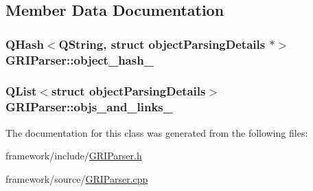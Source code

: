 \subsection{\-Member \-Data \-Documentation}
\hypertarget{classGRIParser_ab99d6201699aaaea0b2b853661fb43c7}{
\subsubsection[{object\-\_\-hash\-\_\-}]{\setlength{\rightskip}{0pt plus 5cm}\-Q\-Hash$<$\-Q\-String, struct {\bf object\-Parsing\-Details} $\ast$$>$ {\bf \-G\-R\-I\-Parser\-::object\-\_\-hash\-\_\-}}}\label{classGRIParser_ab99d6201699aaaea0b2b853661fb43c7}
\hypertarget{classGRIParser_a5a873d2c2129c4c4758ebaa23b651e73}{
\subsubsection[{objs\-\_\-and\-\_\-links\-\_\-}]{\setlength{\rightskip}{0pt plus 5cm}\-Q\-List$<$struct {\bf object\-Parsing\-Details}$>$ {\bf \-G\-R\-I\-Parser\-::objs\-\_\-and\-\_\-links\-\_\-}}}\label{classGRIParser_a5a873d2c2129c4c4758ebaa23b651e73}


\-The documentation for this class was generated from the following files\-:\begin{DoxyCompactItemize}
\item 
framework/include/\hyperlink{GRIParser_8h}{\-G\-R\-I\-Parser.\-h}\item 
framework/source/\hyperlink{GRIParser_8cpp}{\-G\-R\-I\-Parser.\-cpp}\end{DoxyCompactItemize}
